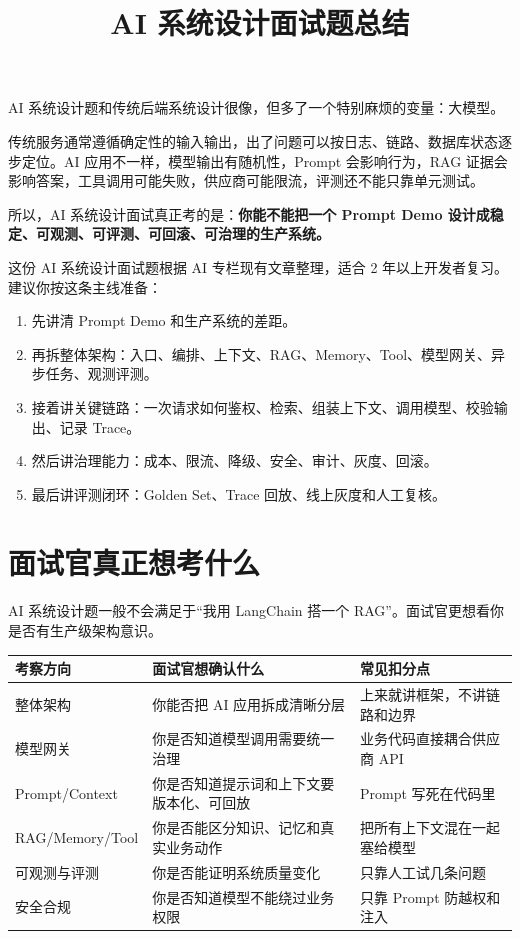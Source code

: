 \documentclass[10pt,a4paper]{ctexart}
\begin{document}
\title{AI 系统设计面试题总结}
\date{}
\maketitle

AI 系统设计题和传统后端系统设计很像，但多了一个特别麻烦的变量：大模型。



传统服务通常遵循确定性的输入输出，出了问题可以按日志、链路、数据库状态逐步定位。AI 应用不一样，模型输出有随机性，Prompt 会影响行为，RAG 证据会影响答案，工具调用可能失败，供应商可能限流，评测还不能只靠单元测试。



所以，AI 系统设计面试真正考的是：\textbf{你能不能把一个 Prompt Demo 设计成稳定、可观测、可评测、可回滚、可治理的生产系统。}



这份 AI 系统设计面试题根据 AI 专栏现有文章整理，适合 2 年以上开发者复习。建议你按这条主线准备：


\begin{enumerate}[itemsep=2pt, topsep=4pt]
  \item 先讲清 Prompt Demo 和生产系统的差距。
  \item 再拆整体架构：入口、编排、上下文、RAG、Memory、Tool、模型网关、异步任务、观测评测。
  \item 接着讲关键链路：一次请求如何鉴权、检索、组装上下文、调用模型、校验输出、记录 Trace。
  \item 然后讲治理能力：成本、限流、降级、安全、审计、灰度、回滚。
  \item 最后讲评测闭环：Golden Set、Trace 回放、线上灰度和人工复核。
\end{enumerate}


\section{面试官真正想考什么}


AI 系统设计题一般不会满足于“我用 LangChain 搭一个 RAG”。面试官更想看你是否有生产级架构意识。


{\footnotesize
\begin{tabularx}{\textwidth}{|X|X|X|}
\hline
\textbf{考察方向} & \textbf{面试官想确认什么} & \textbf{常见扣分点} \\
\hline
整体架构 & 你能否把 AI 应用拆成清晰分层 & 上来就讲框架，不讲链路和边界 \\
\hline
模型网关 & 你是否知道模型调用需要统一治理 & 业务代码直接耦合供应商 API \\
\hline
Prompt/Context & 你是否知道提示词和上下文要版本化、可回放 & Prompt 写死在代码里 \\
\hline
RAG/Memory/Tool & 你是否能区分知识、记忆和真实业务动作 & 把所有上下文混在一起塞给模型 \\
\hline
可观测与评测 & 你是否能证明系统质量变化 & 只靠人工试几条问题 \\
\hline
安全合规 & 你是否知道模型不能绕过业务权限 & 只靠 Prompt 防越权和注入 \\
\hline
\end{tabularx}
}
\end{document}
